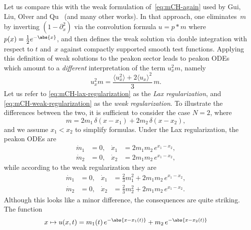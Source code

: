 \documentclass[10pt,a4paper]{article} \pdfoutput=1 
\begin{document}
Let us compare this with the weak formulation of~\eqref{eq:mCH-again}
used by Gui, Liu, Olver and Qu~\cite{gui-liu-olver-qu:2013:mCH-wavebreaking-peakons}
(and many other works).
In that approach, one eliminates~$m$ by inverting $(1-\partial_x^2)$
via the convolution formula $u = p * m$ where $p(x) = \frac12 e^{-\abs{x}}$,
and then defines the weak solution via double integration with respect to $t$ and~$x$ against
compactly supported smooth test functions.
Applying this definition of weak solutions to the peakon sector
leads to peakon ODEs which amount to a \emph{different} interpretation of the term $u_x^2 m$,
namely~\cite{chang-szmigielski:2018:mCH-Lax-integrability-peakon-problem}
\begin{equation}
  \label{eq:mCH-weak-regularization}
  u_x^2 m = \frac{\langle u_x^2\rangle+2\langle u_x \rangle^2}{3} \, m
  .
\end{equation}
Let us refer to \eqref{eq:mCH-lax-regularization} as the \emph{Lax regularization},
and \eqref{eq:mCH-weak-regularization}
as the \emph{weak regularization}.
To illustrate the differences between the two,
it is sufficient to consider the case $N=2$, where
\begin{equation*}
  m = 2 m_1 \, \delta(x-x_1) + 2 m_2 \, \delta(x-x_2)
  ,
\end{equation*}
and we assume $x_1 < x_2$ to simplify formulas.
Under the Lax regularization, the peakon ODEs are
\begin{equation}\label{eq:mCH-twopeakonL}
  \begin{aligned}
    \dot m_1 &= 0
    ,&
    \dot x_1 &= 2 m_1 m_2 \, e^{x_1-x_2}
    ,\\
    \dot m_2 &= 0
    ,&
    \dot x_2 &= 2 m_1 m_2 \, e^{x_1-x_2}
    ,
  \end{aligned}
\end{equation}
while according to the weak regularization they are
\begin{equation}
  \label{eq:mCH-twopeakonW}
  \begin{aligned}
    \dot m_1 &= 0
    ,&
    \dot x_1 &= \tfrac 23 m_1^2 + 2m_1 m_2 \, e^{x_1-x_2}
    ,\\
    \dot m_2 &= 0
    ,&
    \dot x_2 &= \tfrac23 m_2^2 + 2 m_1 m_2 \, e^{x_1-x_2}
    .
  \end{aligned}
\end{equation}
Although this looks like a minor difference, the consequences are quite striking.
The function
\begin{equation*}
  x \mapsto u(x,t) = m_1(t) \, e^{-\abs{x-x_1(t)}} + m_2 \, e^{-\abs{x-x_2(t)}}
\end{equation*}
\end{document}
